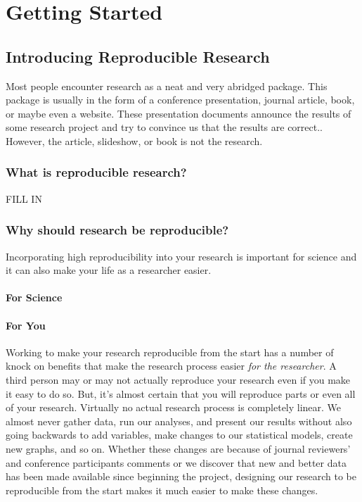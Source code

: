 \documentclass[ChapterTOCs,krantz1]{krantz}\usepackage{graphicx, color}
\begin{document}
\listoffigures
\listoftables
\tableofcontents

\mainmatter

\setcounter{page}{1}

\part{Getting Started}





\chapter{Introducing Reproducible Research}\label{Intro}

Most people encounter research as a neat and very abridged package. This package is usually in the form of a conference presentation, journal article, book, or maybe even a website. These presentation documents announce the results of some research project and try to convince us that the results are correct.\cite{Mesirov2010}. However, the article, slideshow, or book is not the research. 
\section{What is reproducible research?}

FILL IN

\section{Why should research be reproducible?}

Incorporating high reproducibility into your research is important for science and it can also make your life as a researcher easier. 

\subsection{For Science}

\subsection{For You}

Working to make your research reproducible from the start has a number of knock on benefits that make the research process easier {\emph{for the researcher}}. A third person may or may not actually reproduce your research even if you make it easy to do so. But, it's almost certain that you will reproduce parts or even all of your research. Virtually no actual research process is completely linear. We almost never gather data, run our analyses, and present our results without also going backwards to add variables, make changes to our statistical models, create new graphs, and so on. Whether these changes are because of journal reviewers' and conference participants comments or we discover that new and better data has been made available since beginning the project, designing our research to be reproducible from the start makes it much easier to make these changes. 
\end{document}
